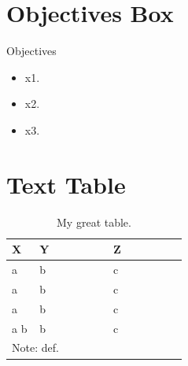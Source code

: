 \section{Objectives Box}
\begin{center}
	\begin{objbox}{Objectives}
		\begin{itemize}
			\setlength{\itemsep}{0pt}
			\setlength{\parskip}{0pt}
			\setlength{\parsep}{0pt}
		
			\item x1.
			\item x2.
			\item x3.
		\end{itemize}
	\end{objbox}
\end{center}


\section{Text Table}
\begin{table}[H]
	\centering
	\begin{tabularx}{0.95\linewidth}{p{0.15\linewidth}p{0.40\linewidth}p{0.40\linewidth}}
		\toprule
		\textbf{X} & \textbf{Y} & \textbf{Z} \\
		\midrule
		a & b & c \\
		a & b & c \\
		a & b & c \\
		a \newline b & b & c \\ %
		\midrule
		\multicolumn{3}{p{0.95\linewidth}}{Note: def.} \\	
		\bottomrule
	\end{tabularx}
	\caption{My great table.}
	\label{tab06.01}
\end{table}


